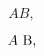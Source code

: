 \documentclass{aa}
\begin{document}
\begin{equation}
  A B,
  \label{eq1}
\end{equation}

\begin{equation}
  A $ B,$
  \label{eq2}
\end{equation}
\end{document}
